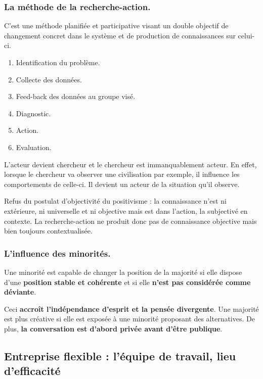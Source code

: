 \documentclass[12pt]{article}
\begin{document}
	\subsubsection*{La méthode de la recherche-action.}
	
	C'est une méthode planifiée et participative visant un double objectif de changement concret dans le système et de production de connaissances sur celui-ci.
	\begin{enumerate}
	\item Identification du problème.
	\item Collecte des données.
	\item Feed-back des données au groupe visé.
	\item Diagnostic.
	\item Action.
	\item Evaluation. \newline
	\end{enumerate}
	
	L'acteur  devient  chercheur  et  le  chercheur  est  immanquablement  acteur. En effet, lorsque le chercheur va observer une civilisation par exemple, il influence les comportements  de  celle-ci.  Il  devient  un  acteur  de  la  situation  qu'il  observe. \newline
	
	Refus  du  postulat  d'objectivité  du  positivisme  :  la  connaissance  n'est  ni  extérieure,  ni universelle  et  ni  objective  mais  est  dans  l'action,  la  subjectivé  en  contexte. La  recherche-action  ne  produit  donc  pas  de  connaissance  objective  mais  bien  toujours contextualisée.
	
	\subsubsection*{L'influence des minorités.}
	
	Une minorité est capable de changer la position de la majorité si elle dispose d'une \textbf{position stable et cohérente} et si elle \textbf{n'est pas considérée comme déviante}. \newline
	
	Ceci \textbf{accroît l'indépendance d'esprit et la pensée divergente}. Une majorité est plus créative si elle est exposée à une minorité proposant des alternatives. De plus, \textbf{la conversation est d'abord privée avant d'être publique}.
	
	\subsection{Entreprise flexible : l'équipe de travail, lieu d'efficacité}
	
\end{document}
